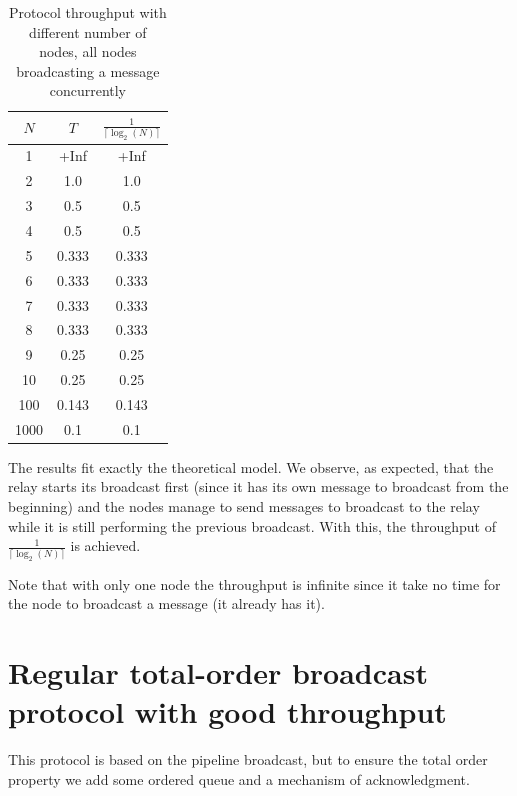 \documentclass[a4paper]{article}
\begin{document}
\begin{table}[H]
    \centering
    \begin{tabular}{|c|c|c|}
        \hline
        $N$   & $T$  & $\frac{1}{\lceil\log_2(N)\rceil}$ \\
        \hline
        1     & +Inf   & +Inf   \\
        2     & 1.0    & 1.0    \\
        3     & 0.5    & 0.5    \\
        4     & 0.5    & 0.5    \\
        5     & 0.333  & 0.333  \\
        6     & 0.333  & 0.333  \\
        7     & 0.333  & 0.333  \\
        8     & 0.333  & 0.333  \\
        9     & 0.25   & 0.25   \\
        10    & 0.25   & 0.25   \\
        100   & 0.143  & 0.143  \\
        1000  & 0.1    & 0.1    \\
        \hline
    \end{tabular}
    \caption{Protocol throughput with different number of nodes, all nodes broadcasting a message concurrently}
    \label{table:thr}
\end{table}

The results fit exactly the theoretical model. We observe, as expected, that
the relay starts its broadcast first (since it has its own message to
broadcast from the beginning) and the nodes manage to send messages to
broadcast to the relay while it is still performing the previous broadcast.
With this, the throughput of $\frac{1}{\lceil\log_2(N)\rceil}$ is achieved.

Note that with only one node the throughput is infinite since it take no time
for the node to broadcast a message (it already has it).

\section{Regular total-order broadcast protocol with good throughput}
\label{sec:throughputTO}
This protocol is based on the pipeline broadcast, but to ensure the total order
property we add some ordered queue and a mechanism of acknowledgment.
\end{document}
